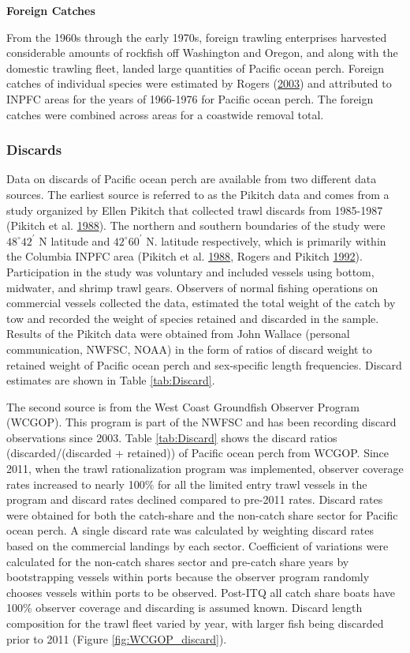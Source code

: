 \documentclass[12pt,]{article}
\begin{document}
\textbf{Foreign Catches}

From the 1960s through the early 1970s, foreign trawling enterprises
harvested considerable amounts of rockfish off Washington and Oregon,
and along with the domestic trawling fleet, landed large quantities of
Pacific ocean perch. Foreign catches of individual species were
estimated by Rogers (\protect\hyperlink{ref-rogers_species_2003}{2003})
and attributed to INPFC areas for the years of 1966-1976 for Pacific
ocean perch. The foreign catches were combined across areas for a
coastwide removal total.

\subsubsection{Discards}\label{discards}

Data on discards of Pacific ocean perch are available from two different
data sources. The earliest source is referred to as the Pikitch data and
comes from a study organized by Ellen Pikitch that collected trawl
discards from 1985-1987 (Pikitch et al.
\protect\hyperlink{ref-pikitch_evaluation_1988}{1988}). The northern and
southern boundaries of the study were \(48^\circ 42^\prime\) N latitude
and \(42^\circ 60^\prime\) N. latitude respectively, which is primarily
within the Columbia INPFC area (Pikitch et al.
\protect\hyperlink{ref-pikitch_evaluation_1988}{1988}, Rogers and
Pikitch \protect\hyperlink{ref-rogers_numerical_1992}{1992}).
Participation in the study was voluntary and included vessels using
bottom, midwater, and shrimp trawl gears. Observers of normal fishing
operations on commercial vessels collected the data, estimated the total
weight of the catch by tow and recorded the weight of species retained
and discarded in the sample. Results of the Pikitch data were obtained
from John Wallace (personal communication, NWFSC, NOAA) in the form of
ratios of discard weight to retained weight of Pacific ocean perch and
sex-specific length frequencies. Discard estimates are shown in Table
\ref{tab:Discard}.

The second source is from the West Coast Groundfish Observer Program
(WCGOP). This program is part of the NWFSC and has been recording
discard observations since 2003. Table \ref{tab:Discard} shows the
discard ratios (discarded/(discarded + retained)) of Pacific ocean perch
from WCGOP. Since 2011, when the trawl rationalization program was
implemented, observer coverage rates increased to nearly 100\% for all
the limited entry trawl vessels in the program and discard rates
declined compared to pre-2011 rates. Discard rates were obtained for
both the catch-share and the non-catch share sector for Pacific ocean
perch. A single discard rate was calculated by weighting discard rates
based on the commercial landings by each sector. Coefficient of
variations were calculated for the non-catch shares sector and pre-catch
share years by bootstrapping vessels within ports because the observer
program randomly chooses vessels within ports to be observed. Post-ITQ
all catch share boats have 100\% observer coverage and discarding is
assumed known. Discard length composition for the trawl fleet varied by
year, with larger fish being discarded prior to 2011 (Figure
\ref{fig:WCGOP_discard}).
\end{document}
